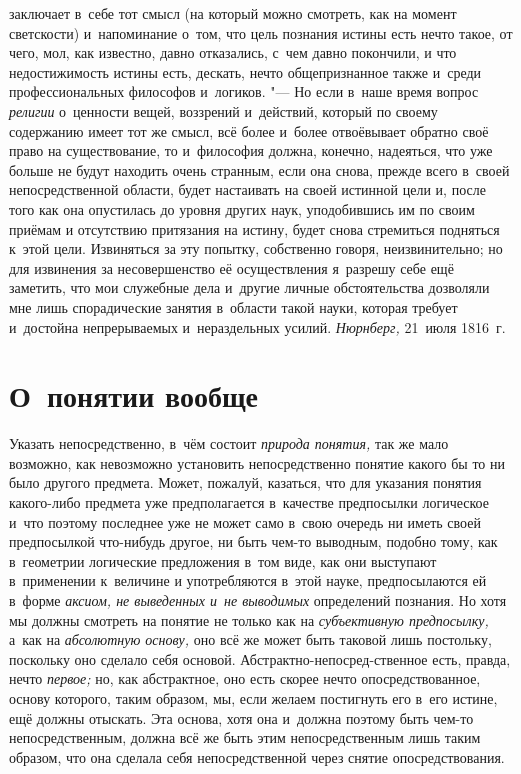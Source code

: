 заключает в~себе тот смысл (на который можно смотреть, как на момент
светскости) и~напоминание о~том, что цель познания истины есть нечто такое,
от чего, мол, как известно, давно отказались, с~чем давно покончили, и
что недостижимость истины есть, дескать, нечто
общепризнанное также и~среди профессиональных философов и~логиков. "---
Но если в~наше время вопрос {\em религии} о~ценности
вещей, воззрений и~действий, который по своему содержанию имеет тот же
смысл, всё более и~более отвоёвывает обратно своё право на существование,
то и~философия должна, конечно, надеяться, что уже больше не будут находить
очень странным, если она снова, прежде всего в~своей непосредственной
области, будет настаивать на своей истинной цели и, после того как она
опустилась до уровня других наук, уподобившись им по своим приёмам и
отсутствию притязания на истину, будет снова стремиться подняться к~этой
цели. Извиняться за эту попытку, собственно говоря, неизвинительно; но для
извинения за несовершенство её осуществления я~разрешу себе ещё заметить,
что мои служебные дела и~другие личные обстоятельства дозволяли мне лишь
спорадические занятия в~области такой науки, которая требует и~достойна
непрерываемых и~нераздельных усилий.
{\em Нюрнберг,} 21~июля 1816~г.

\clearpage

\chapter[О~понятии вообще]{О~понятии вообще}

Указать непосредственно, в~чём состоит {\em природа понятия,}
так же мало возможно, как невозможно установить
непосредственно понятие какого бы то ни было другого предмета. Может,
пожалуй, казаться, что для указания понятия какого-либо предмета уже
предполагается в~качестве предпосылки логическое и~что поэтому последнее
уже не может само в~свою очередь ни иметь своей предпосылкой что-нибудь
другое, ни быть чем-то выводным, подобно тому, как в~геометрии логические
предложения в~том виде, как они выступают в~применении к~величине и
употребляются в~этой науке, предпосылаются ей в~форме
{\em аксиом, не выведенных и~не выводимых} определений познания.
Но хотя мы должны смотреть на понятие не только как на {\em субъективную
предпосылку,} а~как на {\em абсолютную основу,} оно всё же может быть
таковой лишь постольку, поскольку оно сделало себя основой.
Абстрактно-непосред-ственное есть, правда, нечто {\em первое;} но, как
абстрактное, оно есть скорее нечто опосредствованное, основу которого,
таким образом, мы, если желаем постигнуть его в~его истине, ещё должны
отыскать. Эта основа, хотя она и~должна поэтому быть чем-то
непосредственным, должна всё же быть этим непосредственным лишь таким
образом, что она сделала себя непосредственной через снятие
опосредствования.

